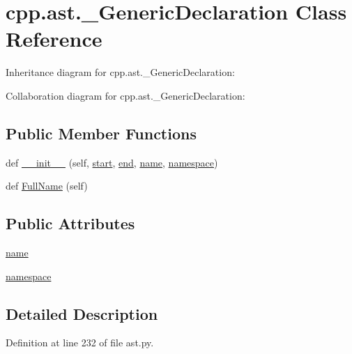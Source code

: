 \hypertarget{classcpp_1_1ast_1_1___generic_declaration}{}\section{cpp.\+ast.\+\_\+\+Generic\+Declaration Class Reference}
\label{classcpp_1_1ast_1_1___generic_declaration}


Inheritance diagram for cpp.\+ast.\+\_\+\+Generic\+Declaration\+:


Collaboration diagram for cpp.\+ast.\+\_\+\+Generic\+Declaration\+:
\subsection*{Public Member Functions}
\begin{DoxyCompactItemize}
\item 
def \hyperlink{classcpp_1_1ast_1_1___generic_declaration_afde72751e20708a7802eb7707d23bc3c}{\+\_\+\+\_\+init\+\_\+\+\_\+} (self, \hyperlink{classcpp_1_1ast_1_1_node_a7b2aa97e6a049bb1a93aea48c48f1f44}{start}, \hyperlink{classcpp_1_1ast_1_1_node_a3c5e5246ccf619df28eca02e29d69647}{end}, \hyperlink{classcpp_1_1ast_1_1___generic_declaration_af774f4729dfd78d0538a6782fe8514c1}{name}, \hyperlink{classcpp_1_1ast_1_1___generic_declaration_a8aee3f11b37449d54b42a78e0a689f46}{namespace})
\item 
def \hyperlink{classcpp_1_1ast_1_1___generic_declaration_a1437d31271ea8cda62da22e2ce427a85}{Full\+Name} (self)
\end{DoxyCompactItemize}
\subsection*{Public Attributes}
\begin{DoxyCompactItemize}
\item 
\hyperlink{classcpp_1_1ast_1_1___generic_declaration_af774f4729dfd78d0538a6782fe8514c1}{name}
\item 
\hyperlink{classcpp_1_1ast_1_1___generic_declaration_a8aee3f11b37449d54b42a78e0a689f46}{namespace}
\end{DoxyCompactItemize}


\subsection{Detailed Description}


Definition at line 232 of file ast.\+py.




